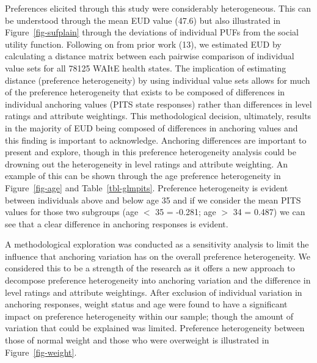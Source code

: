 \documentclass[
  letterpaper,
  DIV=11,
  numbers=noendperiod]{scrartcl}
\begin{document}
Preferences elicited through this study were considerably heterogeneous.
This can be understood through the mean EUD value (47.6) but also
illustrated in Figure~\ref{fig-sufplain} through the deviations of
individual PUFs from the social utility function. Following on from
prior work (13), we estimated EUD by calculating a distance matrix
between each pairwise comparison of individual value sets for all 78125
WAItE health states. The implication of estimating distance (preference
heterogeneity) by using individual value sets allows for much of the
preference heterogeneity that exists to be composed of differences in
individual anchoring values (PITS state responses) rather than
differences in level ratings and attribute weightings. This
methodological decision, ultimately, results in the majority of EUD
being composed of differences in anchoring values and this finding is
important to acknowledge. Anchoring differences are important to present
and explore, though in this preference heterogeneity analysis could be
drowning out the heterogeneity in level ratings and attribute weighting.
An example of this can be shown through the age preference heterogeneity
in Figure~\ref{fig-age} and Table~\ref{tbl-glmpits}. Preference
heterogeneity is evident between individuals above and below age 35 and
if we consider the mean PITS values for those two subgroups (age \(<\)
35 = -0.281; age \(>\) 34 = 0.487) we can see that a clear difference in
anchoring responses is evident.

A methodological exploration was conducted as a sensitivity analysis to
limit the influence that anchoring variation has on the overall
preference heterogeneity. We considered this to be a strength of the
research as it offers a new approach to decompose preference
heterogeneity into anchoring variation and the difference in level
ratings and attribute weightings. After exclusion of individual
variation in anchoring responses, weight status and age were found to
have a significant impact on preference heterogeneity within our sample;
though the amount of variation that could be explained was limited.
Preference heterogeneity between those of normal weight and those who
were overweight is illustrated in Figure~\ref{fig-weight}.
\end{document}
